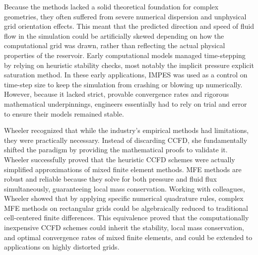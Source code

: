 Because the methods lacked a solid theoretical foundation for complex geometries, they often suffered from severe numerical dispersion and unphysical grid orientation effects. This meant that the predicted direction and speed of fluid flow in the simulation could be artificially skewed depending on how the computational grid was drawn, rather than reflecting the actual physical properties of the reservoir. Early computational models managed time-stepping by relying on heuristic stability checks, most notably the implicit pressure explicit saturation method. In these early applications, IMPES was used as a control on time-step size to keep the simulation from crashing or blowing up numerically. However, because it lacked strict, provable convergence rates and rigorous mathematical underpinnings, engineers essentially had to rely on trial and error to ensure their models remained stable.

Wheeler recognized that while the industry's empirical methods had limitations, they were practically necessary. Instead of discarding CCFD, she fundamentally shifted the paradigm by providing the mathematical proofs to validate it. Wheeler successfully proved that the heuristic CCFD schemes were actually simplified approximations of mixed finite element methods. MFE methods are robust and reliable because they solve for both pressure and fluid flux simultaneously, guaranteeing local mass conservation. Working with colleagues, Wheeler showed that by applying specific numerical quadrature rules, complex MFE methods on rectangular grids could be algebraically reduced to traditional cell-centered finite differences. This equivalence proved that the computationally inexpensive CCFD schemes could inherit the stability, local mass conservation, and optimal convergence rates of mixed finite elements, and could be extended to applications on highly distorted grids.

